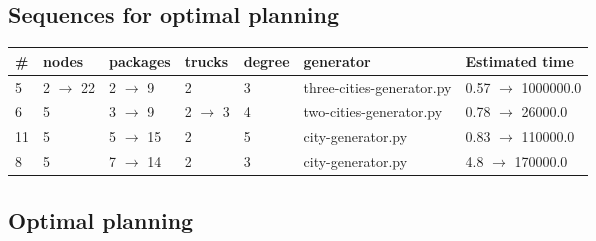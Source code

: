 \documentclass{article}
\begin{document}
                            \subsection*{Sequences for optimal planning}

                            \begin{center}
                            \begin{tabular}{@{}l|l|l|l|l|l|l@{}}
                            \# & nodes & packages & trucks & degree & generator & Estimated time\\\midrule
                            5&2 $\rightarrow$ 22&2 $\rightarrow$ 9&2&3&three-cities-generator.py&0.57 $\rightarrow$ 1000000.0\\
6&5&3 $\rightarrow$ 9&2 $\rightarrow$ 3&4&two-cities-generator.py&0.78 $\rightarrow$ 26000.0\\
11&5&5 $\rightarrow$ 15&2&5&city-generator.py&0.83 $\rightarrow$ 110000.0\\
8&5&7 $\rightarrow$ 14&2&3&city-generator.py&4.8 $\rightarrow$ 170000.0
                            \end{tabular}
                            \end{center}
                    
                                \subsection*{Optimal planning}
                                
\end{document}

